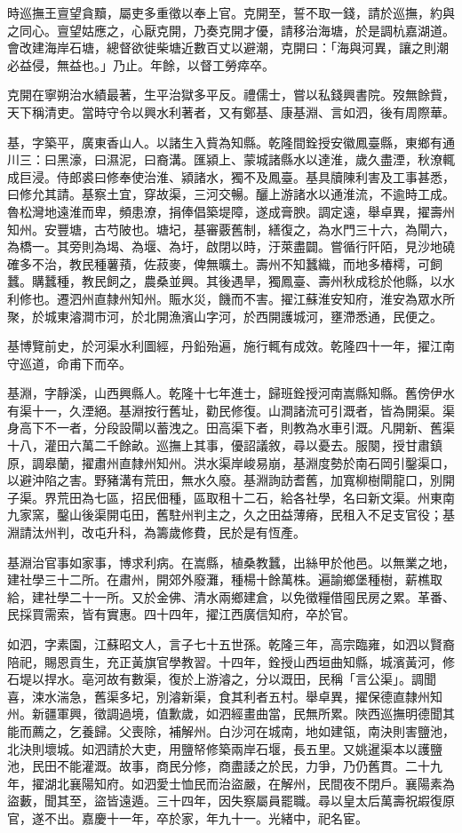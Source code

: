 \begin{pinyinscope}
時巡撫王亶望貪黷，屬吏多重徵以奉上官。克開至，誓不取一錢，請於巡撫，約與之同心。亶望姑應之，心厭克開，乃奏克開才優，請移治海塘，於是調杭嘉湖道。會改建海岸石塘，總督欲徙柴塘近數百丈以避潮，克開曰：「海與河異，讓之則潮必益侵，無益也。」乃止。年餘，以督工勞瘁卒。

克開在寧朔治水績最著，生平治獄多平反。禮儒士，嘗以私錢興書院。歿無餘貲，天下稱清吏。當時守令以興水利著者，又有鄭基、康基淵、言如泗，後有周際華。

基，字築平，廣東香山人。以諸生入貲為知縣。乾隆間銓授安徽鳳臺縣，東鄉有通川三：曰黑濠，曰濕泥，曰裔溝。匯潁上、蒙城諸縣水以達淮，歲久盡湮，秋潦輒成巨浸。侍郎裘曰修奉使治淮、潁諸水，獨不及鳳臺。基具牘陳利害及工事甚悉，曰修允其請。基察土宜，穿故渠，三河交暢。釃上游諸水以通淮流，不逾時工成。魯松灣地遠淮而卑，頻患潦，捐俸倡築堤障，遂成膏腴。調定遠，舉卓異，擢壽州知州。安豐塘，古芍陂也。塘圮，基審覈舊制，繕復之，為水門三十六，為閘六，為橋一。其旁則為堨、為堰、為圩，啟閉以時，汙萊盡闢。嘗循行阡陌，見沙地磽確多不治，教民種薯蕷，佐菽麥，俾無曠土。壽州不知蠶織，而地多椿樗，可飼蠶。購蠶種，教民飼之，農桑並興。其後遇旱，獨鳳臺、壽州秋成稔於他縣，以水利修也。遷泗州直隸州知州。賑水災，饑而不害。擢江蘇淮安知府，淮安為眾水所聚，於城東濬澗市河，於北開漁濱山字河，於西開護城河，壅滯悉通，民便之。

基博覽前史，於河渠水利圖經，丹鉛殆遍，施行輒有成效。乾隆四十一年，擢江南守巡道，命甫下而卒。

基淵，字靜溪，山西興縣人。乾隆十七年進士，歸班銓授河南嵩縣知縣。舊傍伊水有渠十一，久湮絕。基淵按行舊址，勸民修復。山澗諸流可引溉者，皆為開渠。渠身高下不一者，分段設閘以蓄洩之。田高渠下者，則教為水車引溉。凡開新、舊渠十八，灌田六萬二千餘畝。巡撫上其事，優詔議敘，尋以憂去。服闋，授甘肅鎮原，調皋蘭，擢肅州直隸州知州。洪水渠岸峻易崩，基淵度勢於南石岡引鑿渠口，以避沖陷之害。野豬溝有荒田，無水久廢。基淵詢訪耆舊，加寬柳樹閘龍口，別開子渠。界荒田為七區，招民佃種，區取租十二石，給各社學，名曰新文渠。州東南九家窯，鑿山後渠開屯田，舊駐州判主之，久之田益薄瘠，民租入不足支官役；基淵請汰州判，改屯升科，為籌歲修費，民於是有恆產。

基淵治官事如家事，博求利病。在嵩縣，植桑教蠶，出絲甲於他邑。以無業之地，建社學三十二所。在肅州，開郊外廢灘，種楊十餘萬株。遍諭鄉堡種樹，薪樵取給，建社學二十一所。又於金佛、清水兩鄉建倉，以免徵糧借囤民房之累。革番、民採買需索，皆有實惠。四十四年，擢江西廣信知府，卒於官。

如泗，字素園，江蘇昭文人，言子七十五世孫。乾隆三年，高宗臨雍，如泗以賢裔陪祀，賜恩貢生，充正黃旗官學教習。十四年，銓授山西垣曲知縣，城濱黃河，修石堤以捍水。亳河故有數渠，復於上游濬之，分以溉田，民稱「言公渠」。調聞喜，涑水湍急，舊渠多圮，別濬新渠，食其利者五村。舉卓異，擢保德直隸州知州。新疆軍興，徵調過境，值歉歲，如泗經畫曲當，民無所累。陜西巡撫明德聞其能而薦之，乞養歸。父喪除，補解州。白沙河在城南，地如建瓴，南決則害鹽池，北決則壞城。如泗請於大吏，用鹽帑修築兩岸石堰，長五里。又姚暹渠本以護鹽池，民田不能灌溉。故事，商民分修，商盡諉之於民，力爭，乃仍舊貫。二十九年，擢湖北襄陽知府。如泗愛士恤民而治盜嚴，在解州，民間夜不閉戶。襄陽素為盜藪，聞其至，盜皆遠遁。三十四年，因失察屬員罷職。尋以皇太后萬壽祝嘏復原官，遂不出。嘉慶十一年，卒於家，年九十一。光緒中，祀名宦。


\end{pinyinscope}
